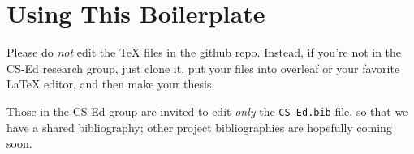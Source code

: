 \section{Using This Boilerplate}

Please do {\em not} edit the TeX files in the github repo.
Instead, if you're not in the CS-Ed research group,
just clone it, put your files into overleaf or your favorite LaTeX editor,
and then make your thesis.

Those in the CS-Ed group are invited to edit {\em only} the {\tt CS-Ed.bib} file,
so that we have a shared bibliography; other project bibliographies are hopefully coming soon.
